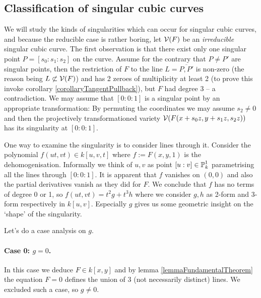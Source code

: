 \subsection{Classification of singular cubic curves}

We will study the kinds of singularities which can occur for singular cubic curves, and because the reducible case is rather boring,
let $\operatorname{\mathcal V}(F)$ be an \emph{irreducible} singular cubic curve.
The first observation is that there exist only one singular point $P = [s_0:s_1:s_2]$ on the curve.
Assume for the contrary that $P \neq P'$ are singular points, then the restriction of $F$ to the line $L = \overline{P,P'}$ is non-zero (the reason being $L \not\subset \operatorname{\mathcal V}(F)$) and has 2 zeroes of multiplicity at least 2 (to prove this invoke corollary \ref{corollaryTangentPullback}), but $F$ had degree 3 -- a contradiction.
We may assume that $[0:0:1]$ is a singular point by an appropriate transformation:
By permuting the coordinates we may assume $s_2 \neq 0$ and then the projectively transformationed variety $\operatorname{\mathcal V}(F(x+s_0z,y+s_1z,s_2z))$ has its singularity at $[0:0:1]$.

One way to examine the singularity is to consider lines through it.
Consider the polynomial $f(ut, vt) \in k[u,v,t]$ where $f := F(x,y,1)$ is the dehomogenisation.
Informally we think of $u,v$ as point $[u:v] \in \operatorname{\mathbb P}^1_k$ parametrising all the lines through $[0:0:1]$.
It is apparent that $f$ vanishes on $(0,0)$ and also the partial derivatives vanish as they did for $F$.
We conclude that $f$ has no terms of degree 0 or 1, so $f(ut,vt) = t^2g + t^3h$ where we consider $g,h$ as 2-form and 3-form respectively in $k[u,v]$.
Especially $g$ gives us some geometric insight on the `shape' of the singularity.

Let's do a case analysis on $g$.
\paragraph{Case 0: $g=0$.}
In this case we deduce $F \in k[x,y]$ and by lemma \ref{lemmaFundamentalTheorem} the equation $F=0$ defines the union of 3 (not necessarily distinct) lines.
We excluded such a case, so $g \neq 0$.

